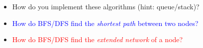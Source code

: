 \documentclass[xcolor={dvipsnames}]{beamer}
\begin{document}
{\begin{columns}
\begin{column}{.5\textwidth}
\end{column}
\end{columns}

${}$\\${}$\\

\normalsize

\begin{itemize}
\item \textcolor{NavyBlue}{How do you implement these algorithms (hint: queue/stack)? } 
\item<9-> \textcolor{blue}{How do BFS/DFS find the \emph{shortest path} between two nodes?}
\item<10-> \textcolor{red}{How do BFS/DFS find the \emph{extended network} of a node?}
\end{itemize}


}
\end{document}
